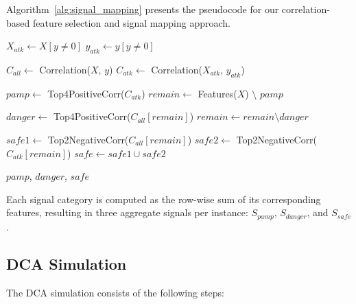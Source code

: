 \documentclass[conference]{IEEEtran}
\begin{document}
Algorithm~\ref{alg:signal_mapping} presents the pseudocode for our correlation-based feature selection and signal mapping approach.

\begin{algorithm}
\caption{Correlation-Based Signal Mapping}
\label{alg:signal_mapping}
\begin{algorithmic}[1]

\State $X_{atk} \gets X[y \neq 0]$ 
\State $y_{atk} \gets y[y \neq 0]$ 

\State $C_{all} \gets$ Correlation($X$, $y$) 
\State $C_{atk} \gets$ Correlation($X_{atk}$, $y_{atk}$) 

\State $pamp \gets$ Top4PositiveCorr($C_{atk}$)
\State $remain \gets$ Features($X$) $\setminus$ $pamp$

\State $danger \gets$ Top4PositiveCorr($C_{all}[remain]$)
\State $remain \gets remain \setminus danger$

\State $safe1 \gets$ Top2NegativeCorr($C_{all}[remain]$)
\State $safe2 \gets$ Top2NegativeCorr($C_{atk}[remain]$)
\State $safe \gets safe1 \cup safe2$

\State \Return $pamp$, $danger$, $safe$
\end{algorithmic}
\end{algorithm}

Each signal category is computed as the row-wise sum of its
corresponding features, resulting in three aggregate signals per
instance: $S_{pamp}$, $S_{danger}$, and $S_{safe}$.

\subsection{DCA Simulation}

The DCA simulation consists of the following steps:
\end{document}
